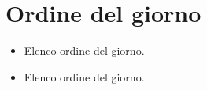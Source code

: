 \section{Ordine del giorno}
\begin{itemize}
    \item Elenco ordine del giorno.
    \item Elenco ordine del giorno.
\end{itemize}
